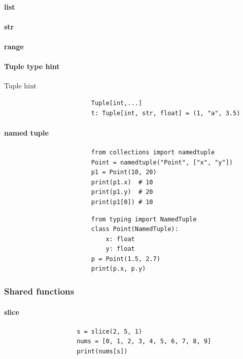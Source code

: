             \paragraph{list}
            
            \paragraph{str}
            \paragraph{range}
        
                \paragraph{Tuple type hint}
                    Tuple hint
                    \begin{verbatim}
                        Tuple[int,...]
                        t: Tuple[int, str, float] = (1, "a", 3.5)
                    \end{verbatim}
                \paragraph{named tuple}
                    \begin{verbatim}
                        from collections import namedtuple
                        Point = namedtuple("Point", ["x", "y"])
                        p1 = Point(10, 20)
                        print(p1.x)  # 10
                        print(p1.y)  # 20
                        print(p1[0]) # 10
                    \end{verbatim}
                    \begin{verbatim}
                        from typing import NamedTuple
                        class Point(NamedTuple):
                            x: float
                            y: float
                        p = Point(1.5, 2.7)
                        print(p.x, p.y)
                    \end{verbatim}
        \subsubsection{Shared functions}
            \paragraph{slice}
                \begin{verbatim}
                    s = slice(2, 5, 1)
                    nums = [0, 1, 2, 3, 4, 5, 6, 7, 8, 9]
                    print(nums[s])
                \end{verbatim}
